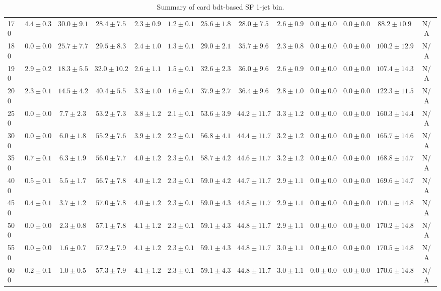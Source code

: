 \begin{table}
{\begin{center}
\begin{tabular}{l | c c | c c c c c c c c  | c c}
170 & $4.4\pm0.3$ & $30.0\pm9.1$ & $28.4\pm7.5$ & $2.3\pm0.9$ & $1.2\pm0.1$ & $25.6\pm1.8$ & $28.0\pm7.5$ & $2.6\pm0.9$ & $0.0\pm0.0$ & $0.0\pm0.0$ & $88.2\pm10.9$ & N/A \\
180 & $0.0\pm0.0$ & $25.7\pm7.7$ & $29.5\pm8.3$ & $2.4\pm1.0$ & $1.3\pm0.1$ & $29.0\pm2.1$ & $35.7\pm9.6$ & $2.3\pm0.8$ & $0.0\pm0.0$ & $0.0\pm0.0$ & $100.2\pm12.9$ & N/A \\
190 & $2.9\pm0.2$ & $18.3\pm5.5$ & $32.0\pm10.2$ & $2.6\pm1.1$ & $1.5\pm0.1$ & $32.6\pm2.3$ & $36.0\pm9.6$ & $2.6\pm0.9$ & $0.0\pm0.0$ & $0.0\pm0.0$ & $107.4\pm14.3$ & N/A \\
200 & $2.3\pm0.1$ & $14.5\pm4.2$ & $40.4\pm5.5$ & $3.3\pm1.0$ & $1.6\pm0.1$ & $37.9\pm2.7$ & $36.4\pm9.6$ & $2.8\pm1.0$ & $0.0\pm0.0$ & $0.0\pm0.0$ & $122.3\pm11.5$ & N/A \\
250 & $0.0\pm0.0$ & $7.7\pm2.3$ & $53.2\pm7.3$ & $3.8\pm1.2$ & $2.1\pm0.1$ & $53.6\pm3.9$ & $44.2\pm11.7$ & $3.3\pm1.2$ & $0.0\pm0.0$ & $0.0\pm0.0$ & $160.3\pm14.4$ & N/A \\
300 & $0.0\pm0.0$ & $6.0\pm1.8$ & $55.2\pm7.6$ & $3.9\pm1.2$ & $2.2\pm0.1$ & $56.8\pm4.1$ & $44.4\pm11.7$ & $3.2\pm1.2$ & $0.0\pm0.0$ & $0.0\pm0.0$ & $165.7\pm14.6$ & N/A \\
350 & $0.7\pm0.1$ & $6.3\pm1.9$ & $56.0\pm7.7$ & $4.0\pm1.2$ & $2.3\pm0.1$ & $58.7\pm4.2$ & $44.6\pm11.7$ & $3.2\pm1.2$ & $0.0\pm0.0$ & $0.0\pm0.0$ & $168.8\pm14.7$ & N/A \\
400 & $0.5\pm0.1$ & $5.5\pm1.7$ & $56.7\pm7.8$ & $4.0\pm1.2$ & $2.3\pm0.1$ & $59.0\pm4.2$ & $44.7\pm11.7$ & $2.9\pm1.1$ & $0.0\pm0.0$ & $0.0\pm0.0$ & $169.6\pm14.7$ & N/A \\
450 & $0.4\pm0.1$ & $3.7\pm1.2$ & $57.0\pm7.8$ & $4.0\pm1.2$ & $2.3\pm0.1$ & $59.0\pm4.3$ & $44.8\pm11.7$ & $2.9\pm1.1$ & $0.0\pm0.0$ & $0.0\pm0.0$ & $170.1\pm14.8$ & N/A \\
500 & $0.0\pm0.0$ & $2.3\pm0.8$ & $57.1\pm7.8$ & $4.1\pm1.2$ & $2.3\pm0.1$ & $59.1\pm4.3$ & $44.8\pm11.7$ & $2.9\pm1.1$ & $0.0\pm0.0$ & $0.0\pm0.0$ & $170.2\pm14.8$ & N/A \\
550 & $0.0\pm0.0$ & $1.6\pm0.7$ & $57.2\pm7.9$ & $4.1\pm1.2$ & $2.3\pm0.1$ & $59.1\pm4.3$ & $44.8\pm11.7$ & $3.0\pm1.1$ & $0.0\pm0.0$ & $0.0\pm0.0$ & $170.5\pm14.8$ & N/A \\
600 & $0.2\pm0.1$ & $1.0\pm0.5$ & $57.3\pm7.9$ & $4.1\pm1.2$ & $2.3\pm0.1$ & $59.1\pm4.3$ & $44.8\pm11.7$ & $3.0\pm1.1$ & $0.0\pm0.0$ & $0.0\pm0.0$ & $170.6\pm14.8$ & N/A \\
\hline
\end{tabular}
\end{center}
}
\caption{Summary of card bdt-based SF 1-jet bin.}
\end{table}
